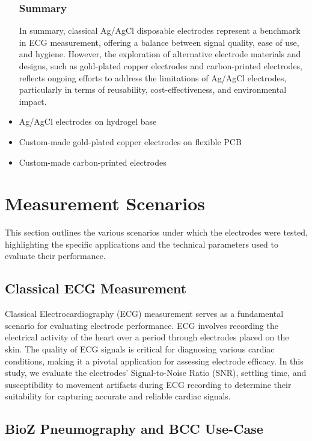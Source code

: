 \documentclass[conference]{IEEEtran}
\begin{document}
\begin{itemize}
\subsubsection{Summary}
In summary, classical Ag/AgCl disposable electrodes represent a benchmark in ECG measurement, offering a balance between signal quality, ease of use, and hygiene. However, the exploration of alternative electrode materials and designs, such as gold-plated copper electrodes and carbon-printed electrodes, reflects ongoing efforts to address the limitations of Ag/AgCl electrodes, particularly in terms of reusability, cost-effectiveness, and environmental impact.

    \item Ag/AgCl electrodes on hydrogel base
    \item Custom-made gold-plated copper electrodes on flexible PCB
    \item Custom-made carbon-printed electrodes
\end{itemize}

\section{Measurement Scenarios}
    This section outlines the various scenarios under which the electrodes were tested, highlighting the specific applications and the technical parameters used to evaluate their performance.
    
    \subsection{Classical ECG Measurement}
        Classical Electrocardiography (ECG) measurement serves as a fundamental scenario for evaluating electrode performance. ECG involves recording the electrical activity of the heart over a period through electrodes placed on the skin. The quality of ECG signals is critical for diagnosing various cardiac conditions, making it a pivotal application for assessing electrode efficacy. In this study, we evaluate the electrodes' Signal-to-Noise Ratio (SNR), settling time, and susceptibility to movement artifacts during ECG recording to determine their suitability for capturing accurate and reliable cardiac signals.

\subsection{BioZ Pneumography and BCC Use-Case}
\end{document}
